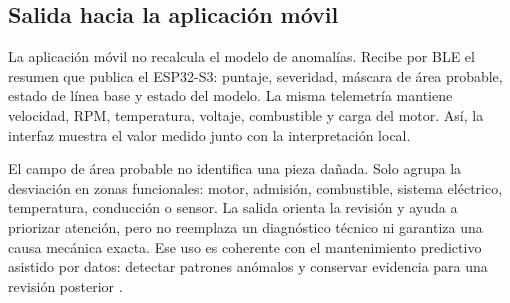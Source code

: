 \documentclass[12pt,letterpaper]{report}
\begin{document}
\subsection{Salida hacia la aplicación móvil}

La aplicación móvil no recalcula el modelo de anomalías. Recibe por BLE el resumen que publica el ESP32-S3: puntaje, severidad, máscara de área probable, estado de línea base y estado del modelo. La misma telemetría mantiene velocidad, RPM, temperatura, voltaje, combustible y carga del motor. Así, la interfaz muestra el valor medido junto con la interpretación local.

El campo de área probable no identifica una pieza dañada. Solo agrupa la desviación en zonas funcionales: motor, admisión, combustible, sistema eléctrico, temperatura, conducción o sensor. La salida orienta la revisión y ayuda a priorizar atención, pero no reemplaza un diagnóstico técnico ni garantiza una causa mecánica exacta. Ese uso es coherente con el mantenimiento predictivo asistido por datos: detectar patrones anómalos y conservar evidencia para una revisión posterior \cite{mahale2025_review_predictive_maintenance,tormos2025_explainable_ai}.
\end{document}
